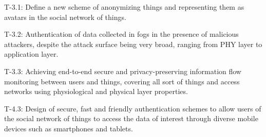 T-3.1: Define a new scheme of anonymizing things and representing them as avatars in the social network of things.

T-3.2: Authentication of data collected in fogs in the presence of malicious attackers, despite the attack surface being very broad, ranging from PHY layer to application layer.

T-3.3: Achieving end-to-end secure and privacy-preserving information flow monitoring between users and things, covering all sort of things and access networks using physiological and physical layer properties.

T-4.3: Design of secure, fast and friendly authentication schemes to allow users of the social network of things to access the data of interest through diverse mobile devices such as smartphones and tablets.
